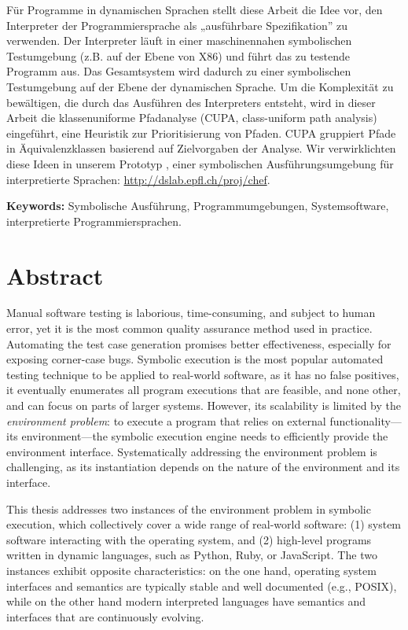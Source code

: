 Für Programme in dynamischen Sprachen stellt diese Arbeit die Idee vor, den Interpreter der Programmiersprache als „ausführbare Spezifikation” zu verwenden. Der Interpreter läuft in einer maschinennahen symbolischen Testumgebung (z.B. auf der Ebene von X86) und führt das zu testende Programm aus. Das Gesamtsystem wird dadurch zu einer symbolischen Testumgebung auf der Ebene der dynamischen Sprache. Um die Komplexität zu bewältigen, die durch das Ausführen des Interpreters entsteht, wird in dieser Arbeit die klassenuniforme Pfadanalyse (CUPA, class-uniform path analysis) eingeführt, eine Heuristik zur Prioritisierung von Pfaden. CUPA gruppiert Pfade in Äquivalenzklassen basierend auf Zielvorgaben der Analyse. Wir verwirklichten diese Ideen in unserem Prototyp \emph{\chef}, einer symbolischen Ausführungsumgebung für interpretierte Sprachen: {\url{http://dslab.epfl.ch/proj/chef}}.

\noindent \textbf{Keywords:} Symbolische Ausführung, Programmumgebungen, Systemsoftware, interpretierte Programmiersprachen.

\chapter*{Abstract}

Manual software testing is laborious, time-consuming, and subject to human error, yet it is the most common quality assurance method used in practice.
%
Automating the test case generation promises better effectiveness, especially for exposing corner-case bugs.
%
Symbolic execution is the most popular automated testing technique to be applied to real-world software, as it has no false positives, it eventually enumerates all program executions that are feasible, and none other, and can focus on parts of larger systems.
%
However, its scalability is limited by the \emph{environment problem}: to execute a program that relies on external functionality---its environment---the symbolic execution engine needs to efficiently provide the environment interface.
%
Systematically addressing the environment problem is challenging, as its instantiation depends on the nature of the environment and its interface.

This thesis addresses two instances of the environment problem in symbolic execution, which collectively cover a wide range of real-world software: (1) system software interacting with the operating system, and (2) high-level programs written in dynamic languages, such as Python, Ruby, or JavaScript.
%
The two instances exhibit opposite characteristics: on the one hand, operating system interfaces and semantics are typically stable and well documented (e.g., POSIX), while on the other hand modern interpreted languages have semantics and interfaces that are continuously evolving.

